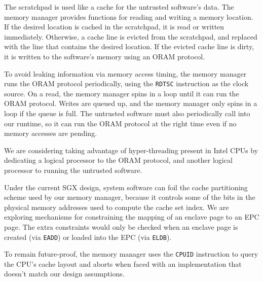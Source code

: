The scratchpad is used like a cache for the untrusted software's data. The
memory manager provides functions for reading and writing a memory location.
If the desired location is cached in the scratchpad, it is read or written
immediately. Otherwise, a cache line is evicted from the scratchpad, and
replaced with the line that contains the desired location. If the evicted cache
line is dirty, it is written to the software's memory using an ORAM protocol.

To avoid leaking information via memory access timing, the memory manager
runs the ORAM protocol periodically, using the \texttt{RDTSC} instruction as
the clock source. On a read, the memory manager spins in a loop until it can
run the ORAM protocol. Writes are queued up, and the memory manager only spins
in a loop if the queue is full. The untrusted software must also periodically
call into our runtime, so it can run the ORAM protocol at the right time
even if no memory accesses are pending.

We are considering taking advantage of hyper-threading present in Intel CPUs by
dedicating a logical processor to the ORAM protocol, and another logical
processor to running the untrusted software.

Under the current SGX design, system software can foil the cache partitioning
scheme used by our memory manager, because it controls some of the bits in the
physical memory addresses used to compute the cache set index. We are exploring
mechanisms for constraining the mapping of an enclave page to an EPC page. The
extra constraints would only be checked when an enclave page is created (via
\texttt{EADD}) or loaded into the EPC (via \texttt{ELDB}).

To remain future-proof, the memory manager uses the \texttt{CPUID} instruction
\cite{intel2013manual} to query the CPU's cache layout and aborts when faced
with an implementation that doesn't match our design assumptions.

